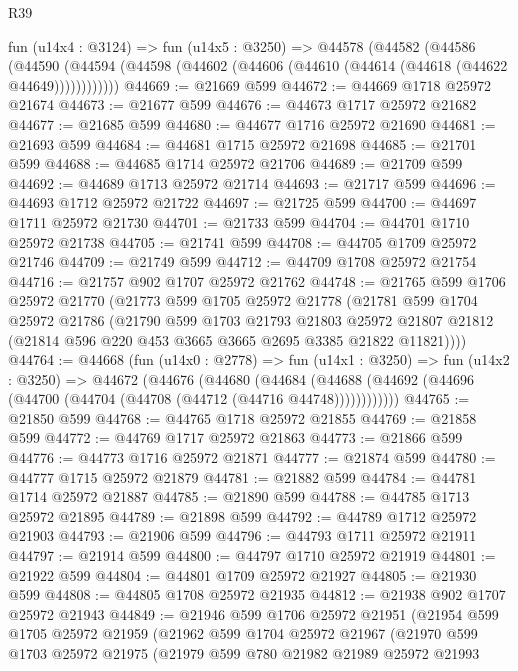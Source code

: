 \begin{lexlean}{R39}
\begin{coremodule}
    fun (u14x4 : @3124) =>
    fun (u14x5 : @3250) =>
    @44578
      (@44582
        (@44586
          (@44590 (@44594 (@44598 (@44602 (@44606 (@44610 (@44614 (@44618 (@44622 @44649))))))))))))
@44669 := @21669 @599
@44672 := @44669 @1718 @25972 @21674
@44673 := @21677 @599
@44676 := @44673 @1717 @25972 @21682
@44677 := @21685 @599
@44680 := @44677 @1716 @25972 @21690
@44681 := @21693 @599
@44684 := @44681 @1715 @25972 @21698
@44685 := @21701 @599
@44688 := @44685 @1714 @25972 @21706
@44689 := @21709 @599
@44692 := @44689 @1713 @25972 @21714
@44693 := @21717 @599
@44696 := @44693 @1712 @25972 @21722
@44697 := @21725 @599
@44700 := @44697 @1711 @25972 @21730
@44701 := @21733 @599
@44704 := @44701 @1710 @25972 @21738
@44705 := @21741 @599
@44708 := @44705 @1709 @25972 @21746
@44709 := @21749 @599
@44712 := @44709 @1708 @25972 @21754
@44716 := @21757 @902 @1707 @25972 @21762
@44748 := @21765
    @599
    @1706
    @25972
    @21770
    (@21773
      @599
      @1705
      @25972
      @21778
      (@21781
        @599
        @1704
        @25972
        @21786
        (@21790
          @599
          @1703
          @21793
          @21803
          @25972
          @21807
          @21812
          (@21814 @596 @220 @453 @3665 @3665 @2695 @3385 @21822 @11821))))
@44764 := @44668
    (fun (u14x0 : @2778) =>
    fun (u14x1 : @3250) =>
    fun (u14x2 : @3250) =>
    @44672
      (@44676
        (@44680
          (@44684 (@44688 (@44692 (@44696 (@44700 (@44704 (@44708 (@44712 (@44716 @44748))))))))))))
@44765 := @21850 @599
@44768 := @44765 @1718 @25972 @21855
@44769 := @21858 @599
@44772 := @44769 @1717 @25972 @21863
@44773 := @21866 @599
@44776 := @44773 @1716 @25972 @21871
@44777 := @21874 @599
@44780 := @44777 @1715 @25972 @21879
@44781 := @21882 @599
@44784 := @44781 @1714 @25972 @21887
@44785 := @21890 @599
@44788 := @44785 @1713 @25972 @21895
@44789 := @21898 @599
@44792 := @44789 @1712 @25972 @21903
@44793 := @21906 @599
@44796 := @44793 @1711 @25972 @21911
@44797 := @21914 @599
@44800 := @44797 @1710 @25972 @21919
@44801 := @21922 @599
@44804 := @44801 @1709 @25972 @21927
@44805 := @21930 @599
@44808 := @44805 @1708 @25972 @21935
@44812 := @21938 @902 @1707 @25972 @21943
@44849 := @21946
    @599
    @1706
    @25972
    @21951
    (@21954
      @599
      @1705
      @25972
      @21959
      (@21962
        @599
        @1704
        @25972
        @21967
        (@21970
          @599
          @1703
          @25972
          @21975
          (@21979
            @599
            @780
            @21982
            @21989
            @25972
            @21993

\end{coremodule}
\end{lexlean}
